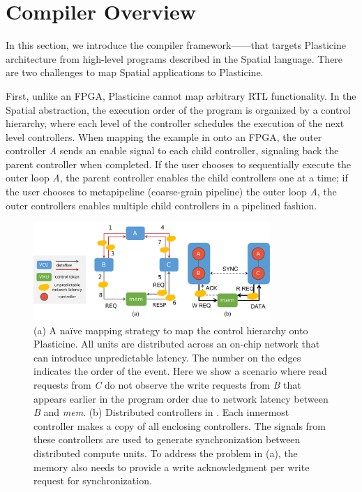 \section{\name Compiler Overview} \label{sec:compileroverview}

In this section, we introduce the compiler framework---\name---that targets Plasticine
architecture from high-level programs described in the Spatial language. 
There are two challenges to map Spatial applications to Plasticine. 

First, unlike an FPGA, Plasticine cannot map arbitrary RTL functionality.
In the Spatial abstraction, the execution order of the program is organized by a control hierarchy, where
each level of the controller schedules the execution of the next level controllers.
When mapping the example in  onto an FPGA, the outer controller \emph{A}
sends an enable signal to each child controller, signaling back the parent controller when
completed. If the user chooses to sequentially execute the outer loop \emph{A}, the parent
controller enables the child controllers one at a time; if the user chooses to metapipeline
(coarse-grain pipeline) the outer loop \emph{A}, the outer controllers enables multiple child controllers in a pipelined fashion.

\begin{figure}
\centering
  \centering
\includegraphics[width=0.8\textwidth]{figs/centralctrl.pdf}
\caption{
  (a) A na\"ive mapping strategy to map the control hierarchy onto Plasticine.
  All units are distributed across an on-chip network that can introduce unpredictable latency.
  The number on the edges indicates the order of the event.
  Here we show a scenario where read requests from \emph{C} do not observe the write requests from
  \emph{B} that appears earlier in the program order due to network latency between \emph{B} and
  \emph{mem}.
  (b) Distributed controllers in \name. Each innermost controller makes a copy of all enclosing controllers. The signals from these controllers are used to generate synchronization between distributed compute units. To address the problem in (a), the memory also needs to provide a write acknowledgment per write request for synchronization.
}
\label{fig:centralctrl}
\end{figure}

